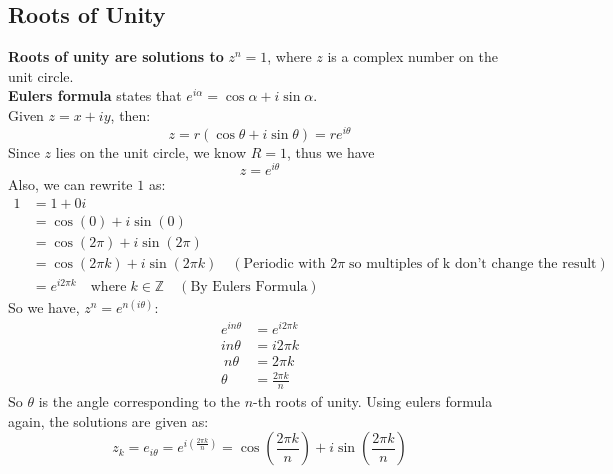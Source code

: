 \documentclass[a4paper,12pt]{article} %
\theoremstyle{definition}
\theoremstyle{plain}
\begin{document}
\subsection{Roots of Unity}
\textbf{Roots of unity are solutions to} $z^n = 1$, where $z$ is a complex number on the unit circle.\\
\textbf{Eulers formula} states that $e^{i\alpha} = \cos\alpha + i\sin\alpha$. \\
Given $z = x+ iy$, then:
$$z = r(\cos\theta + i\sin\theta) = re^{i\theta}$$
Since $z$ lies on the unit circle, we know $R =1$, thus we have 
$$z = e^{i\theta}$$
Also, we can rewrite $1$ as:
\begin{align*}
  1 &= 1 + 0i \\
  &= \cos(0) + i\sin(0) \\
  &= \cos(2\pi) + i\sin(2\pi) \\
  &= \cos(2\pi k) + i\sin(2\pi k) \quad (\text{Periodic with } 2\pi \; \text{so multiples of k don't change the result})\\
  &= e^{i2\pi k} \quad \text{where} \; k \in \mathbb{Z} \quad (\text{By Eulers Formula})
\end{align*}
So we have, $z^n = e^{n(i \theta)}$:
\begin{align*}
  e^{in\theta} &= e^{i2\pi k} \\
  in\theta &= i 2\pi k \\\
  n\theta &= 2\pi k \\
  \theta &= \frac{2\pi k}{n}
\end{align*}
So $\theta$ is the angle corresponding to the $n$-th roots of unity. Using eulers formula again, the solutions are given as:
$$z_k = e_{i\theta} = e^{i(\frac{2\pi k}{n})} = \cos\left(\frac{2\pi k}{n}\right) + i \sin\left(\frac{2\pi k}{n}\right)$$

\pagebreak
\end{document}
